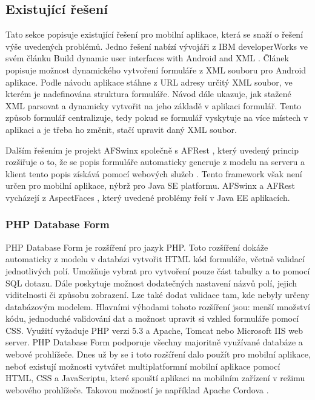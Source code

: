 \subsection{Existující řešení}
Tato sekce popisuje existující řešení pro mobilní aplikace, která se snaží o řešení výše uvedených problémů. Jedno řešení nabízí vývojáři z IBM developerWorks ve svém článku Build dynamic user interfaces with Android and XML \cite{dynamic-android-xml}. Článek popisuje možnost dynamického vytvoření formuláře z XML souboru pro Android aplikace. Podle návodu aplikace stáhne z URL adresy určitý XML soubor, ve kterém je nadefinována struktura formuláře. Návod dále ukazuje, jak stažené XML parsovat a dynamicky vytvořit na jeho základě v aplikaci formulář. Tento způsob formulář centralizuje, tedy pokud se formulář vyskytuje na více místech v aplikaci a je třeba ho změnit, stačí upravit daný XML soubor.

Dalším řešením je projekt AFSwinx společně s AFRest \cite{tomasek-thesis}, který uvedený princip rozšiřuje o to, že se popis formuláře automaticky generuje z modelu na serveru a klient tento popis získává pomocí webových služeb \cite{on-web-services}. Tento framework však není určen pro mobilní aplikace, nýbrž pro Java SE platformu. AFSwinx a AFRest vycházejí z AspectFaces \cite{aspect-faces}, který uvedené problémy řeší v Java EE aplikacích.

\subsubsection{PHP Database Form}
PHP Database Form \cite{phpdbform} je rozšíření pro jazyk PHP. Toto rozšíření dokáže automaticky z modelu v databázi vytvořit HTML kód formuláře, včetně validací jednotlivých polí. Umožňuje vybrat pro vytvoření pouze část tabulky a to pomocí SQL dotazu. Dále poskytuje možnost dodatečných nastavení názvů polí, jejich viditelnosti či způsobu zobrazení. Lze také dodat validace tam, kde nebyly určeny databázovým modelem. Hlavními výhodami tohoto rozšíření jsou: menší množství kódu, jednoduché validování dat a možnost upravit si vzhled formuláře pomocí CSS. Využití vyžaduje PHP verzi 5.3 a Apache, Tomcat nebo Microsoft IIS web server. PHP Database Form podporuje všechny majoritně využívané databáze a webové prohlížeče. Dnes už by se i toto rozšíření dalo použít pro mobilní aplikace, neboť existují možnosti vytvářet multiplatformní mobilní aplikace pomocí HTML, CSS a JavaScriptu, které spouští aplikaci na mobilním zařízení v režimu webového prohlížeče. Takovou možností je například Apache Cordova \cite{apache-cordova}.

